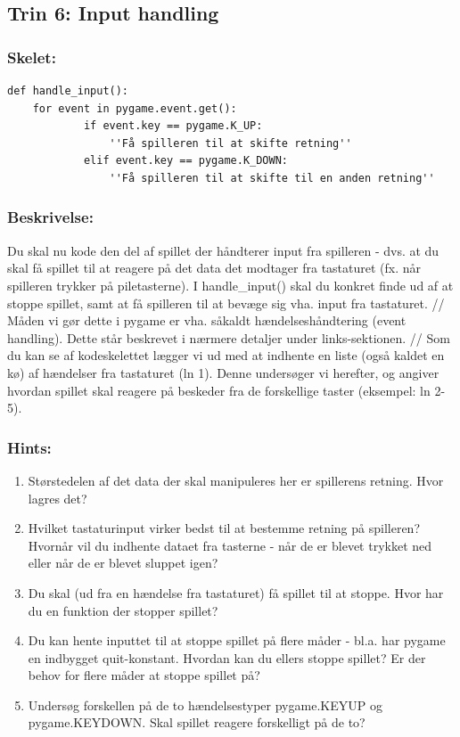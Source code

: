 \documentclass[10pt,a4paper,danish]{article}
\begin{document}
\subsection{Trin 6: Input handling}
\subsubsection{Skelet:} 
\begin{verbatim}
def handle_input():
    for event in pygame.event.get():
            if event.key == pygame.K_UP:
                ''Få spilleren til at skifte retning''
            elif event.key == pygame.K_DOWN:
                ''Få spilleren til at skifte til en anden retning''
\end{verbatim}
\subsubsection{Beskrivelse:}
Du skal nu kode den del af spillet der håndterer input fra spilleren - 
dvs. at du skal få spillet til at reagere på det data det modtager fra
tastaturet (fx. når spilleren trykker på piletasterne). I handle\_input() 
skal du konkret finde ud af at stoppe spillet, samt at få spilleren til 
at bevæge sig vha. input fra tastaturet. 
//
Måden vi gør dette i pygame er vha. såkaldt hændelseshåndtering (event
handling). Dette står beskrevet i nærmere detaljer under links-sektionen. 
//
Som du kan se af kodeskelettet lægger vi ud med at indhente en liste 
(også kaldet en kø) af hændelser fra tastaturet (ln 1). Denne undersøger 
vi herefter, og angiver hvordan spillet skal reagere på beskeder fra de 
forskellige taster (eksempel: ln 2-5). 

\subsubsection{Hints:}
\begin{enumerate}
\item Størstedelen af det data der skal manipuleres her er spillerens retning.
   Hvor lagres det?

\item Hvilket tastaturinput virker bedst til at bestemme retning på spilleren?
   Hvornår vil du indhente dataet fra tasterne - når de er blevet trykket ned
   eller når de er blevet sluppet igen?

\item Du skal (ud fra en hændelse fra tastaturet) få spillet til at stoppe. Hvor
   har du en funktion der stopper spillet?

\item Du kan hente inputtet til at stoppe spillet på flere måder - bl.a. har 
   pygame en indbygget quit-konstant. Hvordan kan du ellers stoppe spillet?
   Er der behov for flere måder at stoppe spillet på?

\item Undersøg forskellen på de to hændelsestyper pygame.KEYUP og pygame.KEYDOWN. 
   Skal spillet reagere forskelligt på de to?
\end{enumerate}
\end{document}
